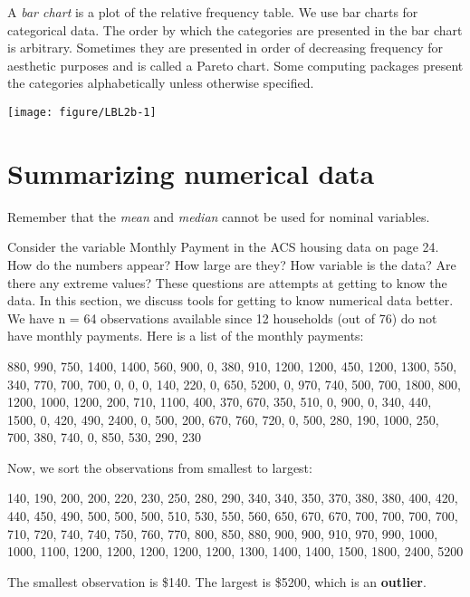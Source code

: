 \documentclass[11pt]{book}\usepackage[]{graphicx}\usepackage[]{color}
\begin{document}
A \textit{bar chart} is a plot of the relative frequency table.  We use bar charts for categorical data. The order by which the categories are presented in the bar chart is arbitrary. Sometimes they are presented in order of decreasing frequency for aesthetic purposes and is called a Pareto chart.  Some computing packages present the categories alphabetically unless otherwise specified.



{\centering \texttt{[image: figure/LBL2b-1]} 

}





\section{Summarizing numerical data}

Remember that the	\textit{mean} and \textit{median} cannot be used for nominal variables.

Consider the variable Monthly Payment in the ACS housing data on page 24.  How do the numbers appear?  How large are they? How variable is the data?  Are there any extreme values? These questions are attempts at getting to know the data.  In this section, we discuss tools for getting to know numerical data better.  We have n = 64 observations available since 12 households (out of 76) do not have monthly payments.  Here is a list of the monthly payments:

{\small{
880, 990, 750, 1400, 1400, 560, 900, 0, 380, 910, 1200, 1200, 450, 1200, 1300, 550, 340, 770, 700, 700, 0, 0, 0, 140, 220, 0, 650, 5200, 0, 970, 740, 500, 700, 1800, 800, 1200, 1000, 1200, 200, 710, 1100, 400, 370, 670, 350, 510, 0, 900, 0, 340, 440, 1500, 0, 420, 490, 2400, 0, 500, 200, 670, 760, 720, 0, 500, 280, 190, 1000, 250, 700, 380, 740, 0, 850, 530, 290, 230
}}

Now, we sort the observations from smallest to largest:

{\small{
140, 190, 200, 200, 220, 230, 250, 280, 290, 340, 340, 350, 370, 380, 380, 400, 420, 440, 450, 490, 500, 500, 500, 510, 530, 550, 560, 650, 670, 670, 700, 700, 700, 700, 710, 720, 740, 740, 750, 760, 770, 800, 850, 880, 900, 900, 910, 970, 990, 1000, 1000, 1100, 1200, 1200, 1200, 1200, 1200, 1300, 1400, 1400, 1500, 1800, 2400, 5200
}}

The smallest observation is \$140.  The largest is \$5200, which is an \textbf{outlier}.
\end{document}

